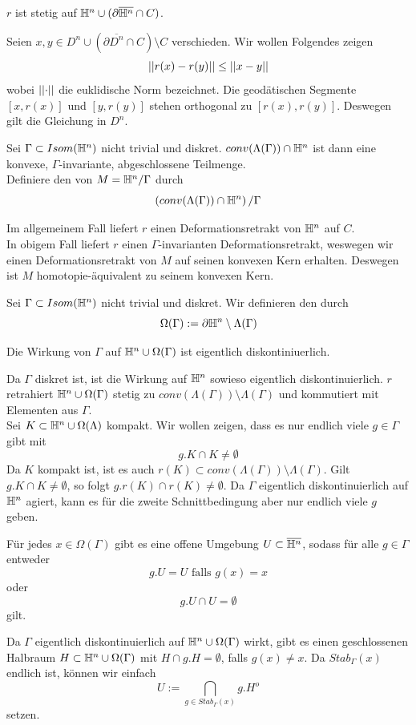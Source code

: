\documentclass{book}
\begin{document}
\Lem{}
$r$ ist stetig auf $\mathbb{H}^n \cup (\partial \overline{\mathbb{H}^n} \cap C)$.
\begin{Beweis}{}
	Seien $x,y \in D^n \cup (\partial \overline{D^n} \cap C) \setminus C$ verschieden. Wir wollen Folgendes zeigen
	\[ \left|\left|r(x) - r(y)\right|\right| \leq \left|\left|x-y\right|\right| \]
	wobei $\left|\left|\cdot\right|\right|$ die euklidische Norm bezeichnet. Die geodätischen Segmente $[x,r(x)]$ und $[y,r(y)]$ stehen orthogonal zu $[r(x), r(y)]$. Deswegen gilt die Gleichung in $D^n$.
\end{Beweis}

\Def{}
Sei $\Gamma \subset Isom(\mathbb{H}^n)$ nicht trivial und diskret. $conv(\Lambda(\Gamma)) \cap \mathbb{H}^n$ ist dann eine konvexe, $\Gamma$-invariante, abgeschlossene Teilmenge.\\
Definiere den  von $M = \mathbb{H}^n / \Gamma$ durch
\[ \left(conv(\Lambda(\Gamma)) \cap \mathbb{H}^n\right) / \Gamma \]

\Bem{}
Im allgemeinem Fall liefert $r$ einen Deformationsretrakt von $\mathbb{H}^n$ auf $C$.\\
In obigem Fall liefert $r$ einen $\Gamma$-invarianten Deformationsretrakt, weswegen wir einen Deformationsretrakt von $M$ auf seinen konvexen Kern erhalten. Deswegen ist $M$ homotopie-äquivalent zu seinem konvexen Kern.


\Def{}
Sei $\Gamma \subset Isom(\mathbb{H}^n)$ nicht trivial und diskret. Wir definieren den  durch
\[ \Omega(\Gamma) := \partial \mathbb{H}^n \setminus \Lambda(\Gamma) \]

\Lem{}
Die Wirkung von $\Gamma$ auf $\mathbb{H}^n \cup \Omega(\Gamma)$ ist eigentlich diskontiniuerlich.
\begin{Beweis}{}
	Da $\Gamma$ diskret ist, ist die Wirkung auf $\mathbb{H}^n$ sowieso eigentlich diskontinuierlich. $r$ retrahiert $\mathbb{H}^n \cup \Omega(\Gamma)$ stetig zu $conv(\Lambda(\Gamma)) \setminus \Lambda(\Gamma)$ und kommutiert mit Elementen aus $\Gamma$.\\
	Sei $K \subset \mathbb{H}^n \cup \Omega(\Lambda)$ kompakt. Wir wollen zeigen, dass es nur endlich viele $g \in \Gamma$ gibt mit
	\[ g.K \cap K \neq \emptyset \]
	Da $K$ kompakt ist, ist es auch $r(K) \subset conv(\Lambda(\Gamma)) \setminus \Lambda(\Gamma)$. Gilt $g.K \cap K \neq \emptyset$, so folgt $g.r(K) \cap r(K) \neq \emptyset$. Da $\Gamma$ eigentlich diskontinuierlich auf $\mathbb{H}^n$ agiert, kann es für die zweite Schnittbedingung aber nur endlich viele $g$ geben.
\end{Beweis}

\Lem{}
Für jedes $x\in \Omega(\Gamma)$ gibt es eine offene Umgebung $U\subset \overline{\mathbb{H}^n}$, sodass für alle $g\in \Gamma$ entweder
\[ g.U = U \text{ falls } g(x) = x \]
oder
\[ g.U \cap U =\emptyset \]
gilt.
\begin{Beweis}{}
	Da $\Gamma$ eigentlich diskontinuierlich auf $\mathbb{H}^n\cup \Omega(\Gamma)$ wirkt, gibt es einen geschlossenen Halbraum $H \subset \mathbb{H}^n \cup \Omega(\Gamma)$ mit $H \cap g.H = \emptyset$, falls $g(x)\neq x$. Da $Stab_\Gamma(x)$ endlich ist, können wir einfach
	\[ U:= \bigcap_{g\in Stab_\Gamma(x)} g.H^o \]
	setzen.
\end{Beweis}
\end{document}
